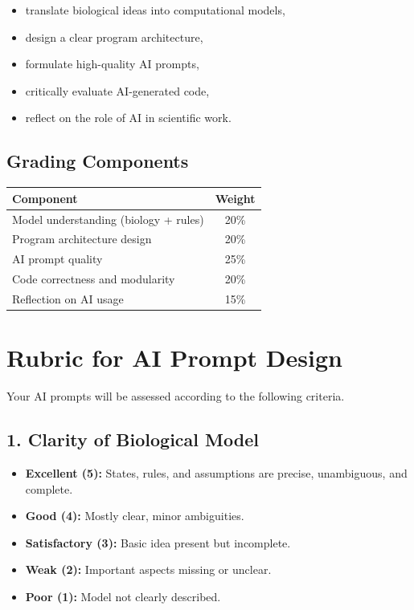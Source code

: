 \documentclass[paper=letter, fontsize=12pt]{article}
\numberwithin{equation}{section}
\begin{document}
\begin{itemize}
\item translate biological ideas into computational models,
\item design a clear program architecture,
\item formulate high-quality AI prompts,
\item critically evaluate AI-generated code,
\item reflect on the role of AI in scientific work.
\end{itemize}

\subsection*{Grading Components}

\begin{center}
\begin{tabular}{|l|c|}
\hline
\textbf{Component} & \textbf{Weight} \\
\hline
Model understanding (biology + rules) & 20\% \\
Program architecture design & 20\% \\
AI prompt quality & 25\% \\
Code correctness and modularity & 20\% \\
Reflection on AI usage & 15\% \\
\hline
\end{tabular}
\end{center}

\bigskip

\section*{Rubric for AI Prompt Design}

Your AI prompts will be assessed according to the following criteria.

\subsection*{1. Clarity of Biological Model}

\begin{itemize}
\item \textbf{Excellent (5):} States, rules, and assumptions are precise, unambiguous, and complete.
\item \textbf{Good (4):} Mostly clear, minor ambiguities.
\item \textbf{Satisfactory (3):} Basic idea present but incomplete.
\item \textbf{Weak (2):} Important aspects missing or unclear.
\item \textbf{Poor (1):} Model not clearly described.
\end{itemize}
\end{document}
